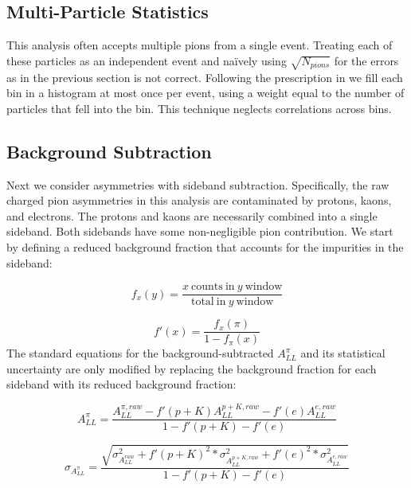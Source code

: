 \subsection{Multi-Particle Statistics}

This analysis often accepts multiple pions from a single event. Treating each
of these particles as an independent event and na\"ively using
$\sqrt{N_{pions}}$ for the errors as in the previous section is not correct.
Following the prescription in \cite{sowinski-multiparticle-statistics} we fill
each bin in a histogram at most once per event, using a weight equal to the
number of particles that fell into the bin. This technique neglects
correlations across bins.

\subsection{Background Subtraction}

Next we consider asymmetries with sideband subtraction. Specifically, the raw
charged pion asymmetries in this analysis are contaminated by protons, kaons,
and electrons. The protons and kaons are necessarily combined into a single
sideband. Both sidebands have some non-negligible pion contribution. We start
by defining a reduced background fraction that accounts for the impurities in
the sideband:

\begin{equation*}
  f_{x}(y) = \frac{x~\mathrm{counts~in}~y~\mathrm{window}}{\mathrm{total~ in}~y~\mathrm{window}}
\end{equation*}

\begin{equation*}
  f'(x) = \frac{f_{x}(\pi)}{1 - f_{\pi}(x)}
\end{equation*}
%
The standard equations for the background-subtracted $A_{LL}^{\pi}$ and its
statistical uncertainty are only modified by replacing the background fraction
for each sideband with its reduced background fraction:

\begin{equation}
  A_{LL}^{\pi} = \frac{ A_{LL}^{\pi,raw} - f'(p+K)A_{LL}^{p+K,raw} - f'(e)A_{LL}^{e,raw} }{1 - f'(p+K) - f'(e) }
  \label{eqn:all}
\end{equation}

\begin{equation}
  \sigma_{A_{LL}^{\pi}} = \frac{\sqrt{ \sigma_{A_{LL}^{raw}}^{2} + f'(p+K)^{2} * \sigma_{A_{LL}^{p+K,raw}}^{2} + f'(e)^{2} * \sigma_{A_{LL}^{e,raw}}^{2} }}{1 - f'(p+K) - f'(e)}
  \label{eqn:sigma-all}
\end{equation}
